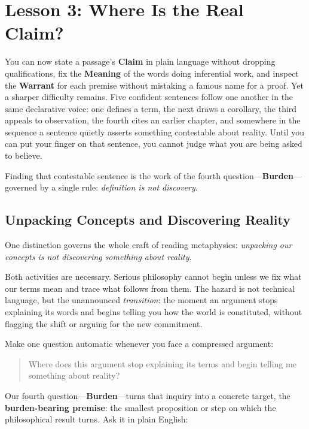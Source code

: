 \section{Lesson 3: Where Is the Real Claim?}

You can now state a passage's \textbf{Claim} in plain language without dropping qualifications, fix the \textbf{Meaning} of the words doing inferential work, and inspect the \textbf{Warrant} for each premise without mistaking a famous name for a proof. Yet a sharper difficulty remains. Five confident sentences follow one another in the same declarative voice: one defines a term, the next draws a corollary, the third appeals to observation, the fourth cites an earlier chapter, and somewhere in the sequence a sentence quietly asserts something contestable about reality. Until you can put your finger on that sentence, you cannot judge what you are being asked to believe.

Finding that contestable sentence is the work of the fourth question---\textbf{Burden}---governed by a single rule: \emph{definition is not discovery}.

\subsection{Unpacking Concepts and Discovering Reality}

One distinction governs the whole craft of reading metaphysics: \emph{unpacking our concepts is not discovering something about reality}.

Both activities are necessary. Serious philosophy cannot begin unless we fix what our terms mean and trace what follows from them. The hazard is not technical language, but the unannounced \emph{transition}: the moment an argument stops explaining its words and begins telling you how the world is constituted, without flagging the shift or arguing for the new commitment.

Make one question automatic whenever you face a compressed argument:

\begin{quote}
Where does this argument stop explaining its terms and begin telling me something about reality?
\end{quote}

Our fourth question---\textbf{Burden}---turns that inquiry into a concrete target, the \textbf{burden-bearing premise}: the smallest proposition or step on which the philosophical result turns. Ask it in plain English:

